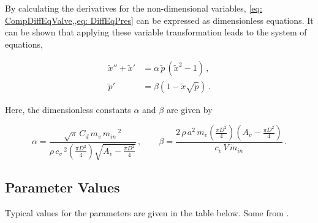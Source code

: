 

By calculating the derivatives for the non-dimensional variables, \cref{eq: CompDiffEqValve,,eq: DiffEqPres} can be expressed as dimensionless equations. It can be shown that applying these variable transformation leads to the system of equations,

\begin{equation} \label{eq: Non-DimODE}
\begin{split}
    \tilde{x}'' + \tilde{x}' &= \alpha \, \tilde{p} \, \left( \tilde{x}^2 - 1 \right) \, ,\\
    \tilde{p}' &= \beta \left( 1 - \tilde{x} \sqrt{\tilde{p}} \right) \, .
\end{split}
\end{equation}

Here, the dimensionless constants $\alpha$ and $\beta$ are given by

\begin{equation*}
    \alpha = %
    \frac{\sqrt{\pi} \, C_d \, m_v \, \dot{m}_{in}\,^2}{\rho \, c_v\,^2 \left( \frac{\pi D^2}{4} \right) \sqrt{A_v - \frac{\pi D^2}{4}} } \, , %
    \qquad
    \beta = %
    \frac{ 2 \, \rho \, a^2 \, m_v \left( \frac{\pi D^2}{4} \right) \left( A_v - \frac{\pi D^2}{4} \right) }{ c_v \, V \, \dot{m}_{in} } \, .
\end{equation*}

\subsection{Parameter Values}

Typical values for the parameters are given in the table below. Some from \cite{Hos2016DynamicService}.


